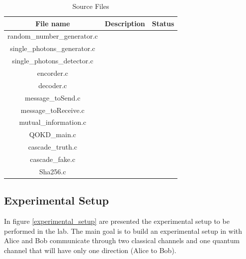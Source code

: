 \begin{table}[H]
\centering
\caption{Source Files}
\label{tab:sourcefiles}
\begin{tabular}{|c|c|c|}
\hline
\textbf{File name}           & \textbf{Description}  & \textbf{Status}       \\ \hline
random\_number\_generator.c  &                       &                       \\ \hline
single\_photons\_generator.c &                       &                       \\ \hline
single\_photons\_detector.c  &                       &                       \\ \hline
encorder.c                   &                       &                       \\ \hline
decoder.c                    &                       &                       \\ \hline
message\_toSend.c              &                       &                       \\ \hline
message\_toReceive.c           &                       &                       \\ \hline
mutual\_information.c        &                       &                       \\ \hline
QOKD\_main.c                 &                       &                       \\ \hline
cascade\_truth.c               &                       &                       \\ \hline
cascade\_fake.c                &                       &                       \\ \hline
Sha256.c                     &                       &                       \\ \hline
\end{tabular}
\end{table}

\subsection{Experimental Setup}

In figure \ref{experimental_setup} are presented the experimental setup to be performed in the lab. The main goal is to build an experimental setup in with Alice and Bob communicate through two classical channels and one quantum channel that will have only one direction (Alice to Bob).

